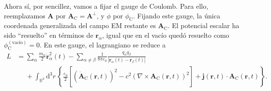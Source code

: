Ahora sí, por sencillez, vamos a fijar el gauge de Coulomb. Para ello, reemplazamos \(\mathbf{A}\) por \(\mathbf{A}_\mathrm{C} =\mathbf{A}^\perp\), y \(\phi\) por \(\phi_\mathrm{C}\). Fijando este gauge, la única coordenada generalizada del campo EM restante es \(\mathbf{A}_\mathrm{C}\). El potencial escalar ha sido ``resuelto'' en términos de \(\mathbf{r}_\alpha\), igual que en el vacío quedó resuelto como \(\phi_\mathrm{C}^{(\text{vacío})} = 0\). En este gauge, el lagrangiano se reduce a 
\begin{align}
    L &= \sum_\alpha \frac{m_\alpha}{2}\dot{\mathbf{r}}_\alpha^2(t) - \sum_{\alpha\neq\beta} \frac{1}{8\pi\varepsilon_0} \frac{q_\alpha q_\beta}{\left|\mathbf{r}_\alpha(t) - \mathbf{r}_\beta(t)\right|} \\
    \nonumber
    &\phantom{=} + \int_{\mathbb{R}^3}\mathrm{d}^3r\, \left\{\frac{\varepsilon_0}{2}\left[\left(\dot{\mathbf{A}}_\mathrm{C}(\mathbf{r}, t)\right)^2 - c^2\left(\nabla\times \mathbf{A}_\mathrm{C}(\mathbf{r}, t)\right)^2\right] + \mathbf{j}(\mathbf{r}, t)\cdot\mathbf{A}_\mathrm{C}(\mathbf{r}, t) \right\}.
\end{align}

